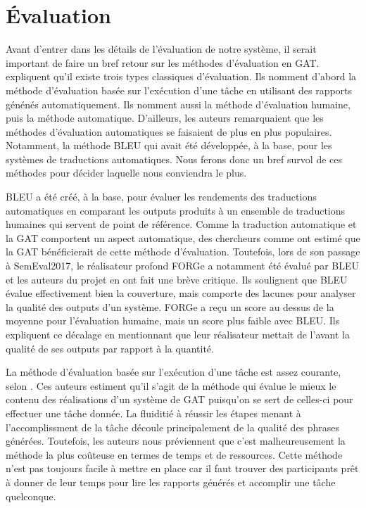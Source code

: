\chapter{Évaluation}\label{ch:eval}

Avant d'entrer dans les détails de l'évaluation de notre système, il serait important de faire un bref retour sur les méthodes d'évaluation en \ac{GAT}. \cite{ReiterInvestigationValidityMetrics2009} expliquent qu'il existe trois types classiques d'évaluation. Ils nomment d'abord la méthode d'évaluation basée sur l'exécution d'une tâche en utilisant des rapports génénés automatiquement. Ils nomment aussi la méthode d'évaluation humaine, puis la méthode automatique. D'ailleurs, les auteurs remarquaient que les méthodes d'évaluation automatiques se faisaient de plus en plus populaires. Notamment, la méthode BLEU  qui avait été développée, à la base, pour les systèmes de traductions automatiques. Nous ferons donc un bref survol de ces méthodes pour décider laquelle nous conviendra le plus.

BLEU a été créé, à la base, pour évaluer les rendements des traductions automatiques en comparant les outputs produits à un ensemble de traductions humaines qui servent de point de référence. Comme la traduction automatique et la \ac{GAT} comportent un aspect automatique, des chercheurs comme \cite{Habash2003MatadorAL, Langkilde-gearyForestbasedstatisticalsentence2000} ont estimé que la \ac{GAT} bénéficierait de cette méthode d'évaluation. Toutefois, lors de son passage à SemEval2017, le réalisateur profond FORGe \citep{DBLP:conf/semeval/MilleCBW17} a notamment été évalué par BLEU et les auteurs du projet en ont fait une brève critique. Ils soulignent que BLEU évalue effectivement bien la couverture, mais comporte des lacunes pour analyser la qualité des outputs d'un système. FORGe a reçu un score au dessus de la moyenne pour l'évaluation humaine, mais un score plus faible avec BLEU. Ils expliquent ce décalage en mentionnant que leur réalisateur mettait de l'avant la qualité de ses outputs par rapport à la quantité.

La méthode d'évaluation basée sur l'exécution d'une tâche est assez courante, selon \cite{ReiterInvestigationValidityMetrics2009}. Ces auteurs estiment qu'il s'agit de la méthode qui évalue le mieux le contenu des réalisations d'un système de \ac{GAT} puisqu'on se sert de celles-ci pour effectuer une tâche donnée. La fluiditié à réussir les étapes menant à l'accomplissment de la tâche découle principalement de la qualité des phrases générées. Toutefois, les auteurs nous préviennent que c'est malheureusement la méthode la plus coûteuse en termes de temps et de ressources. Cette méthode n'est pas toujours facile à mettre en place car il faut trouver des participants prêt à donner de leur temps pour lire les rapports générés et accomplir une tâche quelconque.


